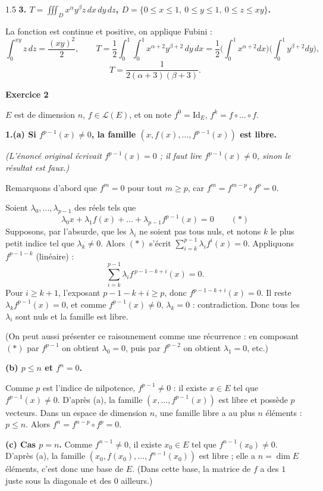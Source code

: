 \documentclass[12pt]{article}
\begin{document}
\begin{spacing}{1.5}
\textbf{3. $T=\displaystyle\iiint_Dx^\alpha y^\beta z\,dx\,dy\,dz$, $D=\{0\le x\le1,\ 0\le y\le1,\ 0\le z\le xy\}$.}

La fonction est continue et positive, on applique Fubini :
\[
\int_0^{xy}z\,dz=\frac{(xy)^2}{2},\qquad T=\frac12\int_0^1\int_0^1x^{\alpha+2}y^{\beta+2}\,dy\,dx=\frac12\Big(\int_0^1x^{\alpha+2}dx\Big)\Big(\int_0^1y^{\beta+2}dy\Big),
\]
\[
\boxed{T=\frac{1}{2(\alpha+3)(\beta+3)}}.
\]

\medskip\textbf{Exercice 2}

$E$ est de dimension $n$, $f\in\mathcal{L}(E)$, et on note $f^0=\mathrm{Id}_E$, $f^k=f\circ\dots\circ f$.

\textbf{1.(a) Si $f^{p-1}(x)\neq0$, la famille $(x,f(x),\dots,f^{p-1}(x))$ est libre.}

\emph{(L'énoncé original écrivait $f^{p-1}(x)=0$ ; il faut lire $f^{p-1}(x)\neq0$, sinon le résultat est faux.)}

Remarquons d'abord que $f^m=0$ pour tout $m\ge p$, car $f^m=f^{m-p}\circ f^p=0$.

Soient $\lambda_0,\dots,\lambda_{p-1}$ des réels tels que
\[
\lambda_0x+\lambda_1f(x)+\dots+\lambda_{p-1}f^{p-1}(x)=0\qquad(\ast)
\]
Supposons, par l'absurde, que les $\lambda_i$ ne soient pas tous nuls, et notons $k$ le plus petit indice tel que $\lambda_k\neq0$. Alors $(\ast)$ s'écrit $\sum_{i=k}^{p-1}\lambda_if^i(x)=0$. Appliquons $f^{p-1-k}$ (linéaire) :
\[
\sum_{i=k}^{p-1}\lambda_if^{\,p-1-k+i}(x)=0 .
\]
Pour $i\ge k+1$, l'exposant $p-1-k+i\ge p$, donc $f^{p-1-k+i}(x)=0$. Il reste $\lambda_kf^{p-1}(x)=0$, et comme $f^{p-1}(x)\neq0$, $\lambda_k=0$ : contradiction. Donc tous les $\lambda_i$ sont nuls et la famille est libre.

(On peut aussi présenter ce raisonnement comme une récurrence : en composant $(\ast)$ par $f^{p-1}$ on obtient $\lambda_0=0$, puis par $f^{p-2}$ on obtient $\lambda_1=0$, etc.)

\textbf{(b) $p\le n$ et $f^n=0$.}

Comme $p$ est l'indice de nilpotence, $f^{p-1}\neq0$ : il existe $x\in E$ tel que $f^{p-1}(x)\neq0$. D'après (a), la famille $(x,\dots,f^{p-1}(x))$ est libre et possède $p$ vecteurs. Dans un espace de dimension $n$, une famille libre a au plus $n$ éléments : $p\le n$. Alors $f^n=f^{n-p}\circ f^p=0$.

\textbf{(c) Cas $p=n$.} Comme $f^{n-1}\neq0$, il existe $x_0\in E$ tel que $f^{n-1}(x_0)\neq0$. D'après (a), la famille $(x_0,f(x_0),\dots,f^{n-1}(x_0))$ est libre ; elle a $n=\dim E$ éléments, c'est donc une base de $E$. (Dans cette base, la matrice de $f$ a des $1$ juste sous la diagonale et des $0$ ailleurs.)


\end{spacing}
\end{document}
